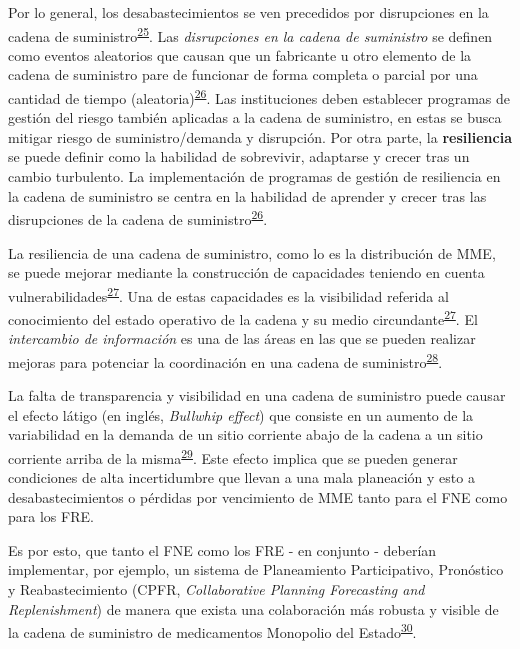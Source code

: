 \documentclass[
]{book}
\begin{document}
Por lo general, los desabastecimientos se ven precedidos por disrupciones en la cadena de suministro\textsuperscript{\protect\hyperlink{ref-FDA2014}{25}}. Las \emph{disrupciones en la cadena de suministro} se definen como eventos aleatorios que causan que un fabricante u otro elemento de la cadena de suministro pare de funcionar de forma completa o parcial por una cantidad de tiempo (aleatoria)\textsuperscript{\protect\hyperlink{ref-Barbosa-Povoa2019}{26}}. Las instituciones deben establecer programas de gestión del riesgo también aplicadas a la cadena de suministro, en estas se busca mitigar riesgo de suministro/demanda y disrupción. Por otra parte, la \textbf{resiliencia} se puede definir como la habilidad de sobrevivir, adaptarse y crecer tras un cambio turbulento. La implementación de programas de gestión de resiliencia en la cadena de suministro se centra en la habilidad de aprender y crecer tras las disrupciones de la cadena de suministro\textsuperscript{\protect\hyperlink{ref-Barbosa-Povoa2019}{26}}.

La resiliencia de una cadena de suministro, como lo es la distribución de MME, se puede mejorar mediante la construcción de capacidades teniendo en cuenta vulnerabilidades\textsuperscript{\protect\hyperlink{ref-Pettit2013}{27}}. Una de estas capacidades es la visibilidad referida al conocimiento del estado operativo de la cadena y su medio circundante\textsuperscript{\protect\hyperlink{ref-Pettit2013}{27}}. El \emph{intercambio de información} es una de las áreas en las que se pueden realizar mejoras para potenciar la coordinación en una cadena de suministro\textsuperscript{\protect\hyperlink{ref-Silver2017}{28}}.

La falta de transparencia y visibilidad en una cadena de suministro puede causar el efecto látigo (en inglés, \emph{Bullwhip effect}) que consiste en un aumento de la variabilidad en la demanda de un sitio corriente abajo de la cadena a un sitio corriente arriba de la misma\textsuperscript{\protect\hyperlink{ref-Cachon2007}{29}}. Este efecto implica que se pueden generar condiciones de alta incertidumbre que llevan a una mala planeación y esto a desabastecimientos o pérdidas por vencimiento de MME tanto para el FNE como para los FRE.

Es por esto, que tanto el FNE como los FRE - en conjunto - deberían implementar, por ejemplo, un sistema de Planeamiento Participativo, Pronóstico y Reabastecimiento (CPFR, \emph{Collaborative Planning Forecasting and Replenishment}) de manera que exista una colaboración más robusta y visible de la cadena de suministro de medicamentos Monopolio del Estado\textsuperscript{\protect\hyperlink{ref-Hollmann2015}{30}}.
\end{document}
